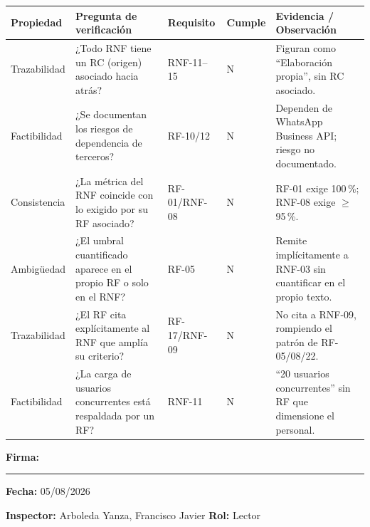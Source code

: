\documentclass[11pt,a4paper]{article}
\begin{document}
\begin{longtable}{p{2.0cm}p{3.2cm}p{1.6cm}p{1.0cm}p{4.0cm}}
\toprule
\textbf{Propiedad} & \textbf{Pregunta de verificación} & \textbf{Requisito} & \textbf{Cumple} & \textbf{Evidencia / Observación} \\
\midrule
\endhead
Trazabilidad & ¿Todo RNF tiene un RC (origen) asociado hacia atrás? & RNF-11--15 & N & Figuran como ``Elaboración propia'', sin RC asociado. \\
Factibilidad & ¿Se documentan los riesgos de dependencia de terceros? & RF-10/12 & N & Dependen de WhatsApp Business API; riesgo no documentado. \\
Consistencia & ¿La métrica del RNF coincide con lo exigido por su RF asociado? & RF-01/RNF-08 & N & RF-01 exige 100\,\%; RNF-08 exige $\geq$95\,\%. \\
Ambigüedad & ¿El umbral cuantificado aparece en el propio RF o solo en el RNF? & RF-05 & N & Remite implícitamente a RNF-03 sin cuantificar en el propio texto. \\
Trazabilidad & ¿El RF cita explícitamente al RNF que amplía su criterio? & RF-17/RNF-09 & N & No cita a RNF-09, rompiendo el patrón de RF-05/08/22. \\
Factibilidad & ¿La carga de usuarios concurrentes está respaldada por un RF? & RNF-11 & N & ``20 usuarios concurrentes'' sin RF que dimensione el personal. \\
\bottomrule
\end{longtable}
\textbf{Firma:} \rule{4cm}{0.4pt} \hfill \textbf{Fecha:} 05/08/2026

\vspace{0.4cm}
\textbf{Inspector:} Arboleda Yanza, Francisco Javier \hfill \textbf{Rol:} Lector
\end{document}
